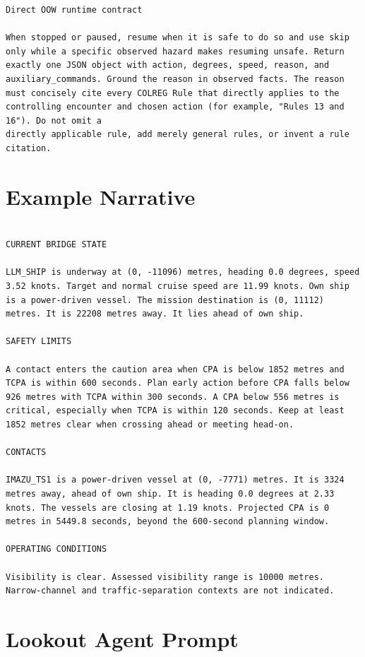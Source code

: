 \documentclass[10pt]{reportMaster}
\begin{document}
\begin{lstlisting}[style=prompt]
Direct OOW runtime contract

When stopped or paused, resume when it is safe to do so and use skip only while a specific observed hazard makes resuming unsafe. Return exactly one JSON object with action, degrees, speed, reason, and auxiliary_commands. Ground the reason in observed facts. The reason must concisely cite every COLREG Rule that directly applies to the controlling encounter and chosen action (for example, "Rules 13 and 16"). Do not omit a
directly applicable rule, add merely general rules, or invent a rule citation.

\end{lstlisting}


\section{Example Narrative}

\begin{lstlisting}[style=prompt]

CURRENT BRIDGE STATE

LLM_SHIP is underway at (0, -11096) metres, heading 0.0 degrees, speed 3.52 knots. Target and normal cruise speed are 11.99 knots. Own ship is a power-driven vessel. The mission destination is (0, 11112) metres. It is 22208 metres away. It lies ahead of own ship.

SAFETY LIMITS

A contact enters the caution area when CPA is below 1852 metres and TCPA is within 600 seconds. Plan early action before CPA falls below 926 metres with TCPA within 300 seconds. A CPA below 556 metres is critical, especially when TCPA is within 120 seconds. Keep at least 1852 metres clear when crossing ahead or meeting head-on.

CONTACTS

IMAZU_TS1 is a power-driven vessel at (0, -7771) metres. It is 3324 metres away, ahead of own ship. It is heading 0.0 degrees at 2.33 knots. The vessels are closing at 1.19 knots. Projected CPA is 0 metres in 5449.8 seconds, beyond the 600-second planning window.

OPERATING CONDITIONS

Visibility is clear. Assessed visibility range is 10000 metres. Narrow-channel and traffic-separation contexts are not indicated.

\end{lstlisting}


\section{Lookout Agent Prompt}
\end{document}
